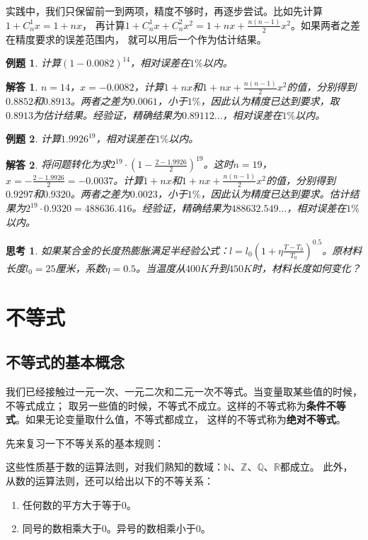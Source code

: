 \documentclass[12pt,UTF8]{ctexbook}
\newtheorem{et}{例题}[section]
\newtheorem{sk}{思考}[section]
\newtheorem*{so}{解答}
\begin{document}
实践中，我们只保留前一到两项，精度不够时，再逐步尝试。比如先计算$1 + C_n^1x = 1 + nx$，
再计算$1 + C_n^1x + C_n^2x^2 = 1 + nx + \frac{n(n-1)}{2}x^2$。如果两者之差在精度要求的误差范围内，
就可以用后一个作为估计结果。
\begin{et}
    计算$(1 - 0.0082)^{14}$，相对误差在$1\%$以内。
\end{et}
\begin{so}
    $n=14$，$x=-0.0082$，计算$1 + nx$和$1 + nx + \frac{n(n-1)}{2}x^2$的值，分别得到$0.8852$和$0.8913$。两者之差为$0.0061$，小于$1\%$，因此认为精度已达到要求，取$0.8913$为估计结果。经验证，精确结果为$0.89112\dots$，相对误差在$1\%$以内。
\end{so}
\begin{et}
    计算$1.9926^{19}$，相对误差在$1\%$以内。
\end{et}
\begin{so}
    将问题转化为求$2^{19}\cdot(1-\frac{2-1.9926}{2})^{19}$。这时$n=19$，$x = -\frac{2-1.9926}{2} = -0.0037$。计算$1 + nx$和$1 + nx + \frac{n(n-1)}{2}x^2$的值，分别得到$0.9297$和$0.9320$。两者之差为$0.0023$，小于$1\%$，因此认为精度已达到要求。估计结果为$2^{19}\cdot 0.9320=488636.416$。经验证，精确结果为$488632.549\dots$，相对误差在$1\%$以内。
\end{so}

\begin{sk}
    如果某合金的长度热膨胀满足半经验公式：$l = l_0(1+\eta\frac{T-T_0}{T_0})^{0.5}$。原材料长度$l_0=25$厘米，系数$\eta=0.5$。当温度从$400K$升到$450K$时，材料长度如何变化？
\end{sk}

\chapter{不等式}

\section{不等式的基本概念}

我们已经接触过一元一次、一元二次和二元一次不等式。当变量取某些值的时候，不等式成立；
取另一些值的时候，不等式不成立。这样的不等式称为\textbf{条件不等式}。如果无论变量取什么值，不等式都成立，
这样的不等式称为\textbf{绝对不等式}。

先来复习一下不等关系的基本规则：

这些性质基于数的运算法则，对我们熟知的数域：$\mathbb{N}$、$\mathbb{Z}$、$\mathbb{Q}$、$\mathbb{R}$都成立。
此外，从数的运算法则，还可以给出以下的不等关系：
\begin{enumerate}
    \item 任何数的平方大于等于$0$。
    \item 同号的数相乘大于$0$。异号的数相乘小于$0$。
\end{enumerate}
\end{document}
